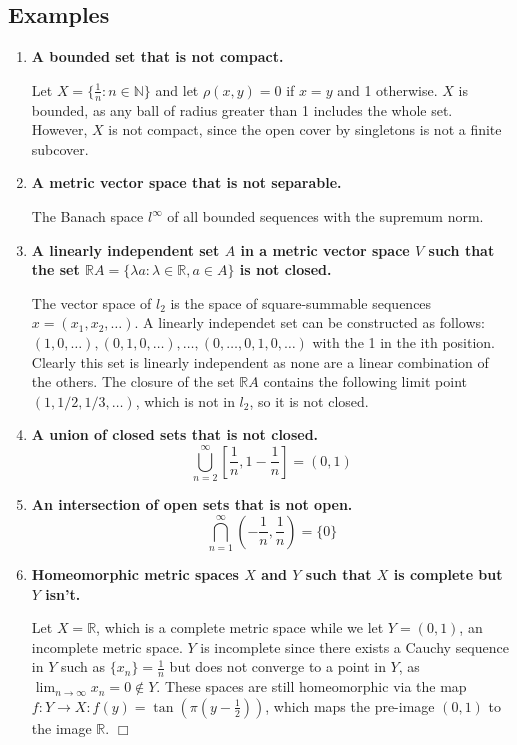 \documentclass[5pt,letterpaper,reqno]{amsart}
\newcommand{\R}{\mathbb R}
\newcommand{\N}{\mathbb N}
\begin{document}
\subsection*{Examples}
\begin{enumerate}[1.]
\item \textbf{A bounded set that is not compact.}
\begin{flushleft}
    Let $X = \{ \frac{1}{n}: n \in \N\}$ and let $\rho(x,y) = 0$ if $x=y$ and 1 otherwise. $X$ is bounded, as any ball of radius greater than 1 includes the whole set. However, $X$ is not compact, since the open cover by singletons is not a finite subcover.
\end{flushleft}
\item \textbf{A metric vector space that is not separable.}
\begin{flushleft}
    The Banach space $l^\infty$ of all bounded sequences with the supremum norm.
\end{flushleft}
\vspace{.75in}
\item \textbf{A linearly independent set $A$ in a metric vector space $V$ such that the set $\R A=\{\lambda a : \lambda \in \R, a\in A\}$ is not closed.}
\begin{flushleft}
    The vector space of $l_2$ is the space of square-summable sequences $x = (x_1, x_2, \ldots)$. A linearly independet set can be constructed as follows: $(1, 0, \ldots), (0, 1, 0, \ldots), \ldots, (0, \ldots, 0, 1, 0, \ldots)$ with the 1 in the ith position. Clearly this set is linearly independent as none are a linear combination of the others. The closure of the set $\R A$ contains the following limit point $(1, 1/2, 1/3, \ldots)$, which is not in $l_2$, so it is not closed.
\end{flushleft}
\item \textbf{A union of closed sets that is not closed.}
$$\bigcup_{n=2}^\infty \left[ \frac{1}{n}, 1 - \frac{1}{n} \right] = (0,1)$$
\item \textbf{An intersection of open sets that is not open.}
$$\bigcap_{n=1}^\infty \left(-\frac{1}{n}, \frac{1}{n} \right) = \{0\}$$
\item \textbf{Homeomorphic metric spaces $X$ and $Y$ such that $X$ is complete but $Y$ isn't.}
\begin{flushleft}
    Let $X = \R$, which is a complete metric space while we let $Y = (0,1)$, an incomplete metric space. $Y$ is incomplete since there exists a Cauchy sequence in $Y$ such as $\{x_n\} = \frac{1}{n}$ but does not converge to a point in $Y$, as $\lim_{n\rightarrow\infty}x_n = 0 \not\in Y$. These spaces are still homeomorphic via the map $f:Y\rightarrow X: f(y) = \tan(\pi(y-\frac{1}{2}))$, which maps the pre-image $(0,1)$ to the image $\R$. $\Box$

\end{flushleft}
\end{enumerate}
\end{document}
